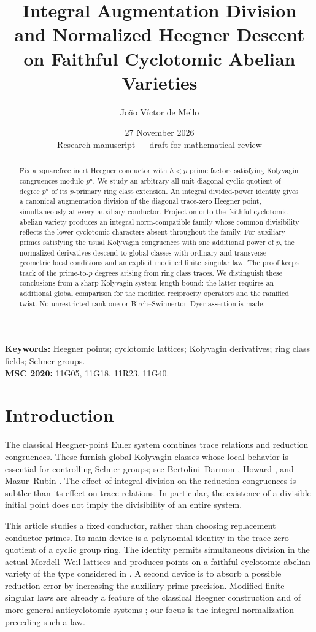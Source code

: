 \documentclass[11pt]{article}
\title{\bfseries Integral Augmentation Division and Normalized Heegner Descent on Faithful Cyclotomic Abelian Varieties}
\author{Jo\~ao V\'ictor de Mello}
\date{27 November 2026\\\small Research manuscript --- draft for mathematical review}
\theoremstyle{definition}\newtheorem{definition}[theorem]{Definition}
\theoremstyle{remark}\newtheorem{remark}[theorem]{Remark}
\begin{document}
\maketitle
\begin{abstract}
Fix a squarefree inert Heegner conductor with $h<p$ prime factors satisfying Kolyvagin congruences modulo $p^a$. We study an arbitrary all-unit diagonal cyclic quotient of degree $p^a$ of its $p$-primary ring class extension. An integral divided-power identity gives a canonical augmentation division of the diagonal trace-zero Heegner point, simultaneously at every auxiliary conductor. Projection onto the faithful cyclotomic abelian variety produces an integral norm-compatible family whose common divisibility reflects the lower cyclotomic characters absent throughout the family. For auxiliary primes satisfying the usual Kolyvagin congruences with one additional power of $p$, the normalized derivatives descend to global classes with ordinary and transverse geometric local conditions and an explicit modified finite--singular law. The proof keeps track of the prime-to-$p$ degrees arising from ring class traces. We distinguish these conclusions from a sharp Kolyvagin-system length bound: the latter requires an additional global comparison for the modified reciprocity operators and the ramified twist. No unrestricted rank-one or Birch--Swinnerton-Dyer assertion is made.
\end{abstract}
\noindent\textbf{Keywords:} Heegner points; cyclotomic lattices; Kolyvagin derivatives; ring class fields; Selmer groups.\\
\textbf{MSC 2020:} 11G05, 11G18, 11R23, 11G40.

\section{Introduction}
The classical Heegner-point Euler system combines trace relations and reduction congruences. These furnish global Kolyvagin classes whose local behavior is essential for controlling Selmer groups; see Bertolini--Darmon \cite{BD}, Howard \cite{Howard}, and Mazur--Rubin \cite{MRKS}. The effect of integral division on the reduction congruences is subtler than its effect on trace relations. In particular, the existence of a divisible initial point does not imply the divisibility of an entire system.

This article studies a fixed conductor, rather than choosing replacement conductor primes. Its main device is a polynomial identity in the trace-zero quotient of a cyclic group ring. The identity permits simultaneous division in the actual Mordell--Weil lattices and produces points on a faithful cyclotomic abelian variety of the type considered in \cite{MRLC}. A second device is to absorb a possible reduction error by increasing the auxiliary-prime precision. Modified finite--singular laws are already a feature of the classical Heegner construction and of more general anticyclotomic systems \cite{Howard,MZ}; our focus is the integral normalization preceding such a law.
\end{document}
